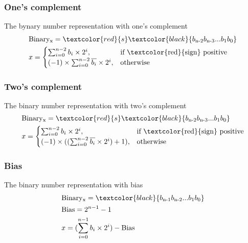 \begin{frame}
    \frametitle{One's complement}
    The bynary number representation with one's complement
    \begin{equation}
        \begin{aligned}
            &\text{Binary}\textsubscript{x}=\textcolor{red}{s}\textcolor{black}{b\textsubscript{n-2}b\textsubscript{n-3}...b\textsubscript{1}b\textsubscript{0}}\\
            &x=\begin{cases}
                    \sum_{i=0}^{n-2} b_i \times 2^i,& \text{if \textcolor{red}{sign} positive} \\
                    (-1) \times \sum_{i=0}^{n-2} \overline{b_i} \times 2^i, & \text{otherwise}
            \end{cases} 
        \end{aligned}
    \end{equation}
\end{frame}

\begin{frame}
    \frametitle{Two's complement}
    The binary number representation with two's complement
    \begin{equation}
        \begin{aligned}
            &\text{Binary}\textsubscript{x}=\textcolor{red}{s}\textcolor{black}{b\textsubscript{n-2}b\textsubscript{n-3}...b\textsubscript{1}b\textsubscript{0}}\\
            &x=\begin{cases}
                    \sum_{i=0}^{n-2} b_i \times 2^i,& \text{if \textcolor{red}{sign} positive} \\
                    (-1) \times ((\sum_{i=0}^{n-2} \overline{b_i} \times 2^i) + 1), & \text{otherwise}
            \end{cases} 
        \end{aligned}
    \end{equation}
\end{frame}

\begin{frame}
    \frametitle{Bias}
    The binary number representation with bias
    \begin{equation}
        \begin{aligned}
            &\text{Binary}\textsubscript{x}=\textcolor{black}{b\textsubscript{n-1}b\textsubscript{n-2}...b\textsubscript{1}b\textsubscript{0}}\\
            &\text{Bias}=2^{n-1}-1\\
            &x=(\sum_{i=0}^{n-1} b_i \times 2^i) - \text{Bias}
        \end{aligned}
    \end{equation}
\end{frame}

